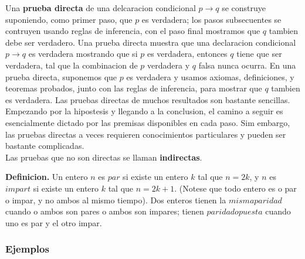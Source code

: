 \documentclass[]{article}
\begin{document}
Una \textbf{prueba directa} de una delcaracion condicional $p \rightarrow q$ se construye suponiendo, como primer paso, que $p$ es verdadera; los pasos subsecuentes se contruyen usando reglas de inferencia, con el paso final mostramos que $q$ tambien debe ser verdadero. Una prueba directa muestra que una declaracion condicional $p \rightarrow q$ es verdadera mostrando que si $p$ es verdadera, entonces $q$ tiene que ser verdadera, tal que la combinacion de $p$ verdadera y $q$ falsa nunca ocurra. En una prueba directa, suponemos que $p$ es verdadera y usamos axiomas, definiciones, y teoremas probados, junto con las reglas de inferencia, para mostrar que $q$ tambien es verdadera. Las pruebas directas de muchos resultados son bastante sencillas. Empezando por la hipostesis y llegando a la conclusion, el camino a seguir es esencialmente dictado por las premisas disponibles en cada paso. Sim embargo, las pruebas directas a veces requieren conocimientos particulares y pueden ser bastante complicadas.\\

Las pruebas que no son directas se llaman \textbf{indirectas}.

\textbf{Definicion.} Un entero $n$ es $par$ si existe un entero $k$ tal que $n = 2k$, y $n$ es $impart$ si existe un entero $k$ tal que $n = 2k + 1$. (Notese que todo entero es o par o impar, y no ambos al mismo tiempo). Dos enteros tienen la $misma paridad$ cuando o ambos son pares o ambos son impares; tienen $paridad opuesta$ cuando uno es par y el otro impar.

\subsubsection*{Ejemplos}
\end{document}
